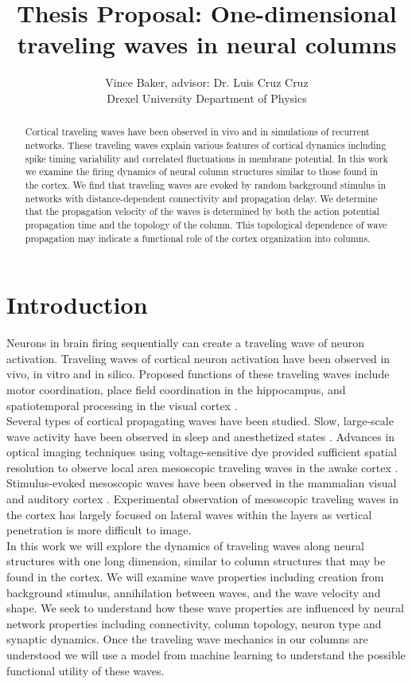 \documentclass[a4paper,11pt]{article}
\title{Thesis Proposal: One-dimensional traveling waves in neural columns}
\author{Vince Baker, advisor: Dr. Luis Cruz Cruz\\ Drexel University Department of Physics}
\begin{document}
\maketitle

\begin{abstract}
Cortical traveling waves have been observed in vivo and in simulations of recurrent networks.
These traveling waves explain various features of cortical dynamics including spike timing variability and correlated fluctuations in membrane potential.
In this work we examine the firing dynamics of neural column structures similar to those found in the cortex.
We find that traveling waves are evoked by random background stimulus in networks with distance-dependent connectivity and propagation delay.
We determine that the propagation velocity of the waves is determined by both the action potential propagation time and the topology of the column.
This topological dependence of wave propagation may indicate a functional role of the cortex organization into columns.

\end{abstract}

\section{Introduction} 
Neurons in brain firing sequentially can create a traveling wave of neuron activation.
Traveling waves of cortical neuron activation have been observed in vivo, in vitro and in silico. 
Proposed functions of these traveling waves include motor coordination, place field coordination in the hippocampus, and spatiotemporal processing in the visual cortex \cite{muller2018}. 
\\
Several types of cortical propagating waves have been studied.
Slow, large-scale wave activity have been observed in sleep and anesthetized states \cite{muller2018}.
Advances in optical imaging techniques using voltage-sensitive dye provided sufficient spatial resolution to observe local area mesoscopic traveling waves in the awake cortex \cite{wu2008}.
Stimulus-evoked mesoscopic waves have been observed in the mammalian visual and auditory cortex \cite{reimer2010}\cite{muller2018}.
Experimental observation of mesoscopic traveling waves in the cortex has largely focused on lateral waves within the layers \cite{muller2018} as vertical penetration is more difficult to image. 
\\
In this work we will explore the dynamics of traveling waves along neural structures with one long dimension, similar to column structures that may be found in the cortex. 
We will examine wave properties including creation from background stimulus, annihilation between waves, and the wave velocity and shape. 
We seek to understand how these wave properties are influenced by neural network properties including connectivity, column topology, neuron type and synaptic dynamics.
Once the traveling wave mechanics in our columns are understood we will use a model from machine learning to understand the possible functional utility of these waves.
\end{document}
